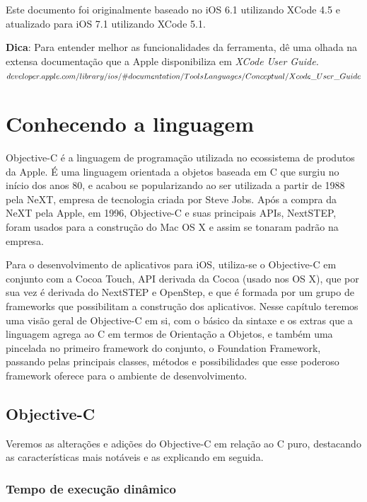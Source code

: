 \documentclass[a4paper,12pt,brazil,doubleside]{book}
\begin{document}
\begin{singlespace}
Este documento foi originalmente baseado no iOS 6.1 utilizando XCode 4.5 e atualizado para iOS 7.1 utilizando XCode 5.1.

\begin{framed}
\textbf{Dica}: Para entender melhor as funcionalidades da ferramenta, dê uma olhada na extensa documentação que a Apple disponibiliza em 
\textit{XCode User Guide.\\
\(developer.apple.com/library/ios/\#documentation/ToolsLanguages/Conceptual/\\Xcode\_User\_Guide\)}
\end{framed}

\chapter{Conhecendo a linguagem}



Objective-C é a linguagem de programação utilizada no ecossistema de produtos da Apple. É uma linguagem orientada a objetos baseada em C que surgiu no início dos anos 80, e acabou se popularizando ao ser utilizada a partir de 1988 pela NeXT, empresa de tecnologia criada por Steve Jobs. Após a compra da NeXT pela Apple, em 1996, Objective-C e suas principais APIs, NextSTEP, foram usados para a construção do Mac OS X e assim se tonaram padrão na empresa.

Para o desenvolvimento de aplicativos para iOS, utiliza-se o Objective-C em conjunto com a Cocoa Touch, API derivada da Cocoa (usado nos OS X), que por sua vez é derivada do NextSTEP e OpenStep, e que é formada por um grupo de frameworks que possibilitam a construção dos aplicativos. Nesse capítulo teremos uma visão geral de Objective-C em si, com o básico da sintaxe e os extras que a linguagem agrega ao C em termos de Orientação a Objetos, e também uma pincelada no primeiro framework do conjunto, o Foundation Framework, passando pelas principais classes, métodos e possibilidades que esse poderoso framework oferece para o ambiente de desenvolvimento.

\section{Objective-C}

Veremos as alterações e adições do Objective-C em relação ao C puro, destacando as características mais notáveis e as explicando em seguida.

\subsection{Tempo de execução dinâmico}



\end{singlespace}
\end{document}
